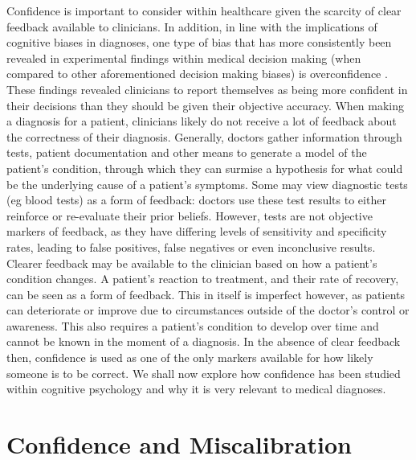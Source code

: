 \documentclass[a4paper, nobind]{templates/ociamthesis}
\begin{document}
\hfill\break
Confidence is important to consider within healthcare given the scarcity of clear feedback available to clinicians. In addition, in line with the implications of cognitive biases in diagnoses, one type of bias that has more consistently been revealed in experimental findings within medical decision making (when compared to other aforementioned decision making biases) is overconfidence \autocite{berner_overconfidence_2008,meyer_physicians_2013}. These findings revealed clinicians to report themselves as being more confident in their decisions than they should be given their objective accuracy. When making a diagnosis for a patient, clinicians likely do not receive a lot of feedback about the correctness of their diagnosis. Generally, doctors gather information through tests, patient documentation and other means to generate a model of the patient's condition, through which they can surmise a hypothesis for what could be the underlying cause of a patient's symptoms. Some may view diagnostic tests (eg blood tests) as a form of feedback: doctors use these test results to either reinforce or re-evaluate their prior beliefs. However, tests are not objective markers of feedback, as they have differing levels of sensitivity and specificity rates, leading to false positives, false negatives or even inconclusive results. Clearer feedback may be available to the clinician based on how a patient's condition changes. A patient's reaction to treatment, and their rate of recovery, can be seen as a form of feedback. This in itself is imperfect however, as patients can deteriorate or improve due to circumstances outside of the doctor's control or awareness. This also requires a patient's condition to develop over time and cannot be known in the moment of a diagnosis. In the absence of clear feedback then, confidence is used as one of the only markers available for how likely someone is to be correct. We shall now explore how confidence has been studied within cognitive psychology and why it is very relevant to medical diagnoses.

\section{Confidence and Miscalibration}\label{confidence-and-miscalibration}
\end{document}
